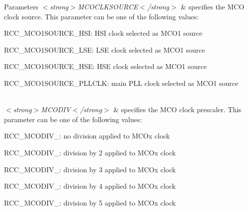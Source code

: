 \begin{DoxyParams}{Parameters}
{\em $<$strong$>$\+M\+C\+O\+C\+L\+K\+S\+O\+U\+R\+C\+E$<$/strong$>$} & specifies the M\+CO clock source. This parameter can be one of the following values\+: \begin{DoxyItemize}
\item R\+C\+C\+\_\+\+M\+C\+O1\+S\+O\+U\+R\+C\+E\+\_\+\+H\+SI\+: H\+SI clock selected as M\+C\+O1 source \item R\+C\+C\+\_\+\+M\+C\+O1\+S\+O\+U\+R\+C\+E\+\_\+\+L\+SE\+: L\+SE clock selected as M\+C\+O1 source \item R\+C\+C\+\_\+\+M\+C\+O1\+S\+O\+U\+R\+C\+E\+\_\+\+H\+SE\+: H\+SE clock selected as M\+C\+O1 source \item R\+C\+C\+\_\+\+M\+C\+O1\+S\+O\+U\+R\+C\+E\+\_\+\+P\+L\+L\+C\+LK\+: main P\+LL clock selected as M\+C\+O1 source \end{DoxyItemize}
\\
\hline
{\em $<$strong$>$\+M\+C\+O\+D\+I\+V$<$/strong$>$} & specifies the M\+CO clock prescaler. This parameter can be one of the following values\+: \begin{DoxyItemize}
\item R\+C\+C\+\_\+\+M\+C\+O\+D\+I\+V\+\_\+: no division applied to M\+C\+Ox clock \item R\+C\+C\+\_\+\+M\+C\+O\+D\+I\+V\+\_\+: division by 2 applied to M\+C\+Ox clock \item R\+C\+C\+\_\+\+M\+C\+O\+D\+I\+V\+\_\+: division by 3 applied to M\+C\+Ox clock \item R\+C\+C\+\_\+\+M\+C\+O\+D\+I\+V\+\_\+: division by 4 applied to M\+C\+Ox clock \item R\+C\+C\+\_\+\+M\+C\+O\+D\+I\+V\+\_\+: division by 5 applied to M\+C\+Ox clock \end{DoxyItemize}
\\
\hline
\end{DoxyParams}
\mbox{\label{group___r_c_c_ex___m_c_ox___clock___config_gabb7360422910dd65312786fc49722d25}} 
